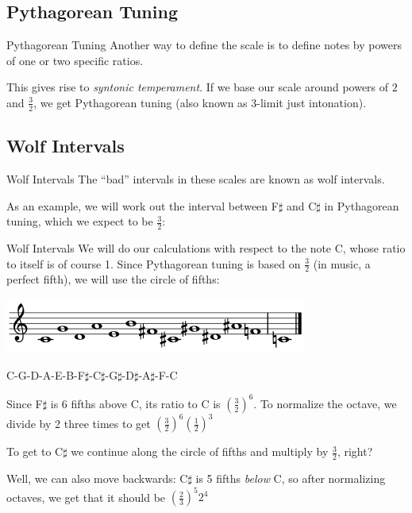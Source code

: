 \documentclass{beamer}
\begin{document}
\subsection{Pythagorean Tuning}
\begin{frame}{Pythagorean Tuning}
    \pause Another way to define the scale is to define notes by powers of one or two specific ratios.
    
    \pause This gives rise to \textit{syntonic temperament}. If we base our scale around powers of $2$ and $\frac{3}{2}$, we get Pythagorean tuning (also known as 3-limit just intonation).
\end{frame}

\subsection{Wolf Intervals}
\begin{frame}{Wolf Intervals}
    \pause The ``bad'' intervals in these scales are known as wolf intervals.
    
    \pause As an example, we will work out the interval between F$\sharp$ and C$\sharp$ in Pythagorean tuning, which we expect to be $\frac{3}{2}$:
\end{frame}

\begin{frame}{Wolf Intervals}
    \pause We will do our calculations with respect to the note C, whose ratio to itself is of course 1. Since Pythagorean tuning is based on $\frac{3}{2}$ (in music, a perfect fifth), we will use the circle of fifths:
    
    \begin{minipage}{.49\textwidth}
        \includegraphics[width=\textwidth]{citcle-of-fifths.png}
    \end{minipage}
    \begin{minipage}{.49\textwidth}
        \small{C-G-D-A-E-B-F$\sharp$-C$\sharp$-G$\sharp$-D$\sharp$-A$\sharp$-F-C}
    \end{minipage}
    
    \pause Since F$\sharp$ is 6 fifths above C, its ratio to C is
    $\left( \frac{3}{2} \right)^6$. To normalize the octave, we divide by 2 three times to get $\left( \frac{3}{2} \right)^6 \left( \frac{1}{2} \right)^{3}$
    
    \pause To get to C$\sharp$ we continue along the circle of fifths and multiply by $\frac{3}{2}$, right?
    
    \pause Well, we can also move backwards: C$\sharp$ is 5 fifths \textit{below} C, so after normalizing octaves, we get that it should be $\left( \frac{2}{3} \right)^5 2^4$
\end{frame}
\end{document}
